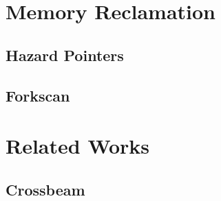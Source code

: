 \section{Memory Reclamation}
\lorem{}

\subsection{Hazard Pointers\label{sec:hazard-pointers}}
\lorem{}

\subsection{Forkscan\label{sec:forkscan}}
\lorem{}


\section{Related Works}
\lorem{}

\subsection{Crossbeam}
\lorem{}
